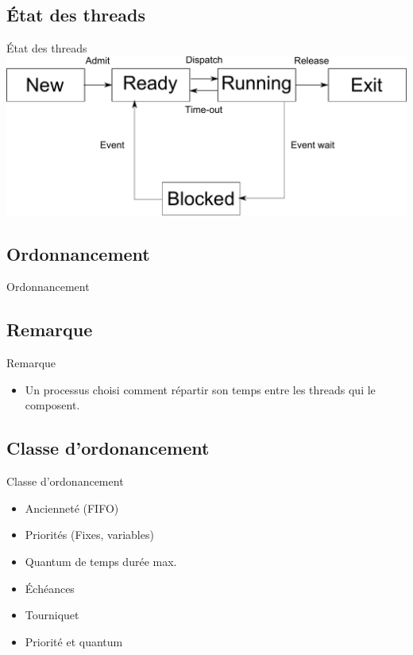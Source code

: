 \def\sectitle{État des threads}
\subsection{\sectitle}
\begin{frame}{\sectitle}
    \includegraphics[width=\textwidth]{../images/StateSimple.pdf}
\end{frame}


\def\sectitle{Ordonnancement}
\subsection{\sectitle}
\begin{frame}{\sectitle}
\def\subsectitle{Remarque}
\subsection{\subsectitle}
\begin{block}{\subsectitle}
\begin{itemize}
    \item Un processus choisi comment répartir son temps entre les threads qui
        le composent. 
\end{itemize}
\end{block}
\def\subsectitle{Classe d'ordonancement}
\subsection{\subsectitle}
\begin{block}{\subsectitle}
\begin{itemize}
    \item Ancienneté (FIFO)
    \item Priorités (Fixes, variables)
    \item Quantum de temps durée max.
    \item Échéances
    \item Tourniquet
    \item Priorité et quantum
\end{itemize}
\end{block}
\end{frame}



